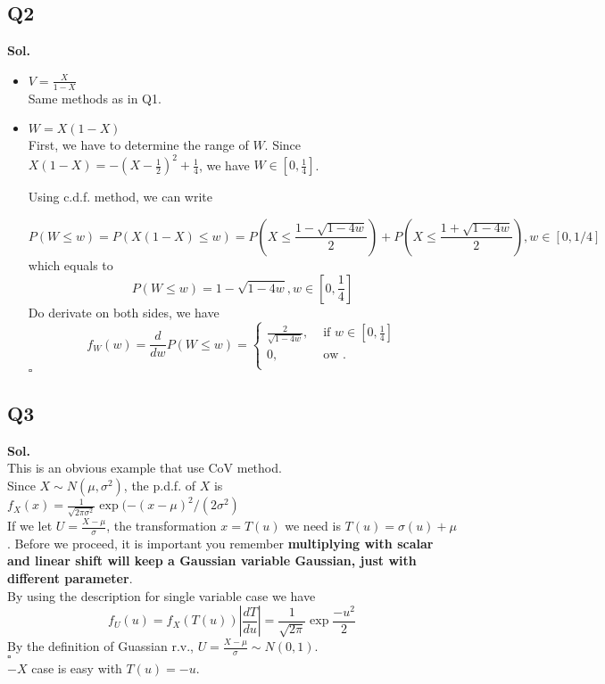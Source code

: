 \documentclass[12pt]{article}
\begin{document}
\subsection*{Q2}
\textbf{Sol.}\\ 
\begin{itemize}
    \item \textbf{\(V = \frac{X}{1-X}\)}\\
    Same methods as in Q1.  
    \item \textbf{\(W = X(1-X)\)}\\
    First, we have to determine the range of \(W\). Since \(X(1-X) = -(X-\frac{1}{2})^{2} +\frac{1}{4}\), we have \(W \in [0,\frac{1}{4}]\). 
    
    Using c.d.f. method, we can write

    \[
       P(W \leq w) = P(X(1-X) \leq w) = P(X \leq \frac{1-\sqrt{1-4w} }{2}) + P(X \leq \frac{1+\sqrt{1-4w} }{2}), w \in [0,1/4]
    \]  
    which equals to 
    \[
      P(W \leq w) = 1 - \sqrt{1-4w}, w\in [0,\frac{1}{4}]
    \] 
    Do derivate on both sides, we have 
    \[
      f_{W} (w) = \frac{d}{dw}P(W \leq w) = \begin{cases}
         \frac{2}{\sqrt{1-4w} }, &\text{ if }  w \in [0,\frac{1}{4}] \\ 
         0, &\text{ ow }.\\
      \end{cases}
    \]
    \hspace{\textwidth}\(\square \) 
\end{itemize}

\subsection*{Q3}
\textbf{Sol.}\\ 
This is an obvious example that use CoV method.\\
Since \(X\sim N(\mu ,\sigma ^{2})\), the p.d.f. of \(X\) is \(f_{X} (x) = \frac{1}{\sqrt{2\pi \sigma ^{2} } } \exp (-(x-\mu )^2 /(2\sigma ^{2} )\)\\
If we let \(U = \frac{X-\mu }{\sigma }\), the transformation \(x = T(u)\) we need is \(T(u) = \sigma (u) + \mu \). 
Before we proceed, it is important you remember \textbf{multiplying with scalar and linear shift will keep a Gaussian variable Gaussian, just with different parameter}. \\  
By using the description for single variable case we have 
\[
   f_{U} (u) = f_{X} (T(u)) \left\vert \frac{dT}{du} \right\vert = \frac{1}{\sqrt{2\pi } } \exp{\frac{-u^2}{2}} 
\]     
By the definition of Guassian r.v., \(U  = \frac{X - \mu }{\sigma } \sim N(0,1)\).  
\\ \hspace{\textwidth}\(\square\) \\
\(-X\) case is easy with \(T(u) = -u\).   
\end{document}

